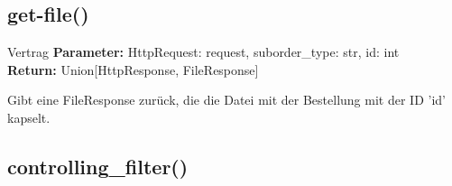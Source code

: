 \documentclass[12pt]{article}
\newcommand{\insetMethodDescription}{-0.7cm}
\begin{document}
\subsection{get-file()}
\begin{contract}{Vertrag}
    \textbf{Parameter:} HttpRequest: request, suborder_type: str, id: int \\
    \textbf{Return:} Union[HttpResponse, FileResponse]
\end{contract}
\hspace{\insetMethodDescription{}}
Gibt eine FileResponse zurück, die die Datei mit der Bestellung mit der ID 'id' kapselt.


\subsection{controlling_filter()}
\end{document}
